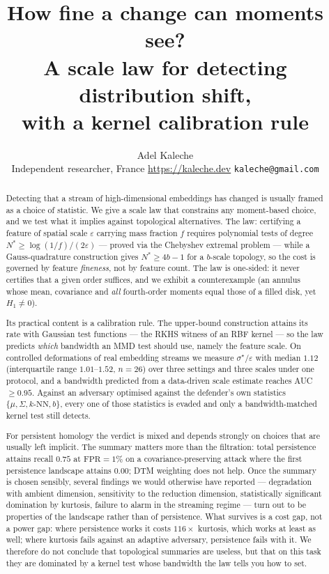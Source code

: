 \documentclass[11pt]{article}
\title{How fine a change can moments see?\\
A scale law for detecting distribution shift,\\
with a kernel calibration rule}
\author{Adel Kaleche\\\small Independent researcher, France \quad \url{https://kaleche.dev} \quad \texttt{kaleche@gmail.com}}
\date{}
\theoremstyle{remark}
\begin{document}
\maketitle

\begin{abstract}
Detecting that a stream of high-dimensional embeddings has changed is usually framed as a choice
of statistic. We give a scale law that constrains any moment-based choice, and we test what it
implies against topological alternatives. The law: certifying a feature of spatial scale
$\varepsilon$ carrying mass fraction $f$ requires polynomial tests of degree
$N^*\ge\log(1/f)/(2\varepsilon)$ --- proved via the Chebyshev extremal problem --- while a
Gauss-quadrature construction gives $N^*\ge4b-1$ for a $b$-scale topology, so the cost is governed
by feature \emph{fineness}, not by feature count. The law is one-sided: it never certifies that a
given order suffices, and we exhibit a counterexample (an annulus whose mean, covariance and
\emph{all} fourth-order moments equal those of a filled disk, yet $H_1\neq0$).

Its practical content is a calibration rule. The upper-bound construction attains its rate with
Gaussian test functions --- the RKHS witness of an RBF kernel --- so the law predicts \emph{which}
bandwidth an MMD test should use, namely the feature scale. On controlled deformations of real
embedding streams we measure $\sigma^\star/\varepsilon$ with median $1.12$ (interquartile range $1.01$--$1.52$,
$n=26$) over three settings and three scales under one protocol, and a bandwidth predicted from a data-driven scale estimate reaches
AUC $\ge0.95$.
Against an adversary optimised against the defender's own statistics $\{\mu,\Sigma,k\text{-NN},b\}$,
every one of those statistics is evaded and only a bandwidth-matched kernel test still detects.

For persistent homology the verdict is mixed and depends strongly on choices that are usually left
implicit. The summary matters more than the filtration: total persistence attains recall $0.75$ at
$\mathrm{FPR}=1\%$ on a covariance-preserving attack where the first persistence landscape attains
$0.00$; DTM weighting does not help. Once the summary is chosen sensibly, several findings we would otherwise have reported ---
degradation with ambient dimension, sensitivity to the reduction dimension, statistically
significant domination by kurtosis, failure to alarm in the streaming regime --- turn out to be
properties of the landscape rather than of persistence. What survives is a cost gap, not a power
gap: where persistence works it costs $116\times$ kurtosis, which works at least as well; where
kurtosis fails against an adaptive adversary, persistence fails with it.
We therefore do not conclude that topological summaries are useless, but that on this task they are
dominated by a kernel test whose bandwidth the law tells you how to set.
\end{abstract}
\end{document}
